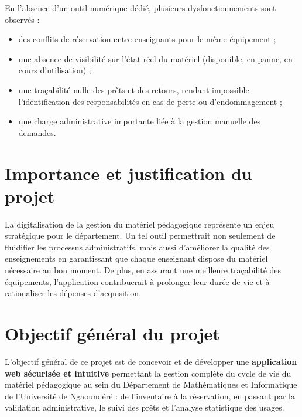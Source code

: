 \documentclass[12pt,a4paper]{report}
\begin{document}
En l'absence d'un outil num\'erique d\'edi\'e, plusieurs
dysfonctionnements sont observ\'es :
\begin{itemize}[noitemsep,topsep=2pt]
  \item des conflits de r\'eservation entre enseignants pour le m\^eme \'equipement ;
  \item une absence de visibilit\'e sur l'\'etat r\'eel du mat\'eriel
        (disponible, en panne, en cours d'utilisation) ;
  \item une tra\c{c}abilit\'e nulle des pr\^ets et des retours, rendant
        impossible l'identification des responsabilit\'es en cas de perte
        ou d'endommagement ;
  \item une charge administrative importante li\'ee \`a la gestion manuelle
        des demandes.
\end{itemize}

\section{Importance et justification du projet}

La digitalisation de la gestion du mat\'eriel p\'edagogique repr\'esente
un enjeu strat\'egique pour le d\'epartement. Un tel outil permettrait
non seulement de fluidifier les processus administratifs, mais aussi
d'am\'eliorer la qualit\'e des enseignements en garantissant que chaque
enseignant dispose du mat\'eriel n\'ecessaire au bon moment. De plus,
en assurant une meilleure tra\c{c}abilit\'e des \'equipements,
l'application contribuerait \`a prolonger leur dur\'ee de vie et \`a
rationaliser les d\'epenses d'acquisition.


\section{Objectif g\'en\'eral du projet}

L'objectif g\'en\'eral de ce projet est de concevoir et de d\'evelopper
une \textbf{application web s\'ecuris\'ee et intuitive} permettant la
gestion compl\`ete du cycle de vie du mat\'eriel p\'edagogique au sein
du D\'epartement de Math\'ematiques et Informatique de l'Universit\'e
de Ngaound\'er\'e : de l'inventaire \`a la r\'eservation, en passant
par la validation administrative, le suivi des pr\^ets et l'analyse
statistique des usages.

\end{document}
